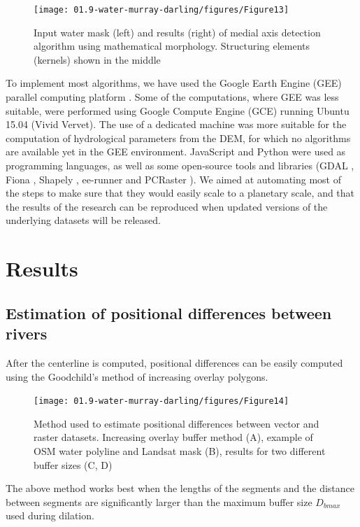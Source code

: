 \begin{figure}
	\centering
	\texttt{[image: 01.9-water-murray-darling/figures/Figure13]}
	\caption{Input water mask (left) and results (right) of medial axis detection algorithm using mathematical morphology. Structuring elements (kernels) shown in the middle}
	\label{fig:au-skeleton}
\end{figure}

To implement most algorithms, we have used the Google Earth Engine (GEE) parallel computing platform \citet{Gorelick2012}. Some of the computations, where GEE was less suitable, were performed using Google Compute Engine (GCE) running Ubuntu 15.04 (Vivid Vervet). The use of a dedicated machine was more suitable for the computation of hydrological parameters from the DEM, for which no algorithms are available yet in the GEE environment. JavaScript and Python were used as programming languages, as well as some open-source tools and libraries (GDAL \citet{GDAL}, Fiona \citet{webFiona}, Shapely \citet{webShapely}, ee-runner \citet{webEErunner} and PCRaster \citet{Karssenberg2010}). We aimed at automating most of the steps to make sure that they would easily scale to a planetary scale, and that the results of the research can be reproduced when updated versions of the underlying datasets will be released.

\section{Results}
\subsection{Estimation of positional differences between rivers}
After the centerline is computed, positional differences can be easily computed using the Goodchild’s method of increasing overlay polygons.

\begin{figure}
	\centering
	\texttt{[image: 01.9-water-murray-darling/figures/Figure14]}
	\caption{Method used to estimate positional differences between vector and raster datasets. Increasing overlay buffer method (A), example of OSM water polyline and Landsat mask (B), results for two different buffer sizes (C, D)}
	\label{fig:au-positional-accurracy-method}
\end{figure}

The above method works best when the lengths of the segments and the distance between segments are significantly larger than the maximum buffer size $D_{bmax}$ used during dilation. 


